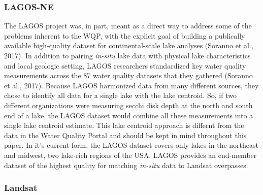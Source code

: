 \documentclass[]{article}
\begin{document}
\hypertarget{lagos-ne}{%
\subsubsection{LAGOS-NE}\label{lagos-ne}}

The LAGOS project was, in part, meant as a direct way to address some of
the problems inherent to the WQP, with the explicit goal of building a
publically available high-quality dataset for continental-scale lake
analyses (Soranno et al., 2017). In addition to pairing \emph{in-situ}
lake data with physical lake characteristics and local geologic setting,
LAGOS researchers standardized key water quality measurements across the
87 water quality datasets that they gathered (Soranno et al., 2017).
Because LAGOS harmonized data from many different sources, they chose to
identify all data for a single lake with the lake centroid. So, if two
different organizations were measuring secchi disk depth at the north
and south end of a lake, the LAGOS dataset would combine all these
measurements into a single lake centroid estimate. This lake centroid
approach is differnt from the data in the Water Quality Portal and
should be kept in mind throughout this paper. In it's current form, the
LAGOS dataset covers only lakes in the northeast and midwest, two
lake-rich regions of the USA. LAGOS provides an end-member dataset of
the highest quality for matching \emph{in-situ} data to Landsat
overpasses.

\hypertarget{landsat}{%
\subsubsection{Landsat}\label{landsat}}
\end{document}
